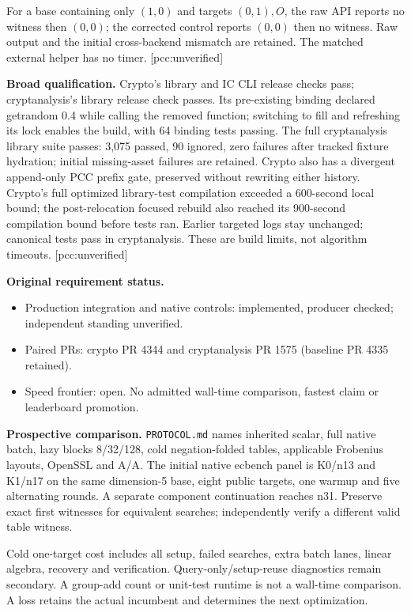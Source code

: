 \documentclass[10pt]{article}
\begin{document}
For a base containing only $(1,0)$ and targets $(0,1),O$, the raw API reports no witness then $(0,0)$; the corrected control reports $(0,0)$ then no witness. Raw output and the initial cross-backend mismatch are retained. The matched external helper has no timer. [pcc:unverified]

\textbf{Broad qualification.} Crypto's library and IC CLI release checks pass; cryptanalysis's library release check passes. Its pre-existing binding declared getrandom 0.4 while calling the removed function; switching to fill and refreshing its lock enables the build, with 64 binding tests passing. The full cryptanalysis library suite passes: 3,075 passed, 90 ignored, zero failures after tracked fixture hydration; initial missing-asset failures are retained. Crypto also has a divergent append-only PCC prefix gate, preserved without rewriting either history. Crypto's full optimized library-test compilation exceeded a 600-second local bound; the post-relocation focused rebuild also reached its 900-second compilation bound before tests ran. Earlier targeted logs stay unchanged; canonical tests pass in cryptanalysis. These are build limits, not algorithm timeouts. [pcc:unverified]

\textbf{Original requirement status.}
\begin{itemize}
\item Production integration and native controls: implemented, producer checked; independent standing unverified.
\item Paired PRs: crypto PR 4344 and cryptanalysis PR 1575 (baseline PR 4335 retained).
\item Speed frontier: open. No admitted wall-time comparison, fastest claim or leaderboard promotion.
\end{itemize}

\textbf{Prospective comparison.} \texttt{PROTOCOL.md} names inherited scalar, full native batch, lazy blocks 8/32/128, cold negation-folded tables, applicable Frobenius layouts, OpenSSL and A/A. The initial native ecbench panel is K0/n13 and K1/n17 on the same dimension-5 base, eight public targets, one warmup and five alternating rounds. A separate component continuation reaches n31. Preserve exact first witnesses for equivalent searches; independently verify a different valid table witness.

Cold one-target cost includes all setup, failed searches, extra batch lanes, linear algebra, recovery and verification. Query-only/setup-reuse diagnostics remain secondary. A group-add count or unit-test runtime is not a wall-time comparison. A loss retains the actual incumbent and determines the next optimization.
\end{document}
